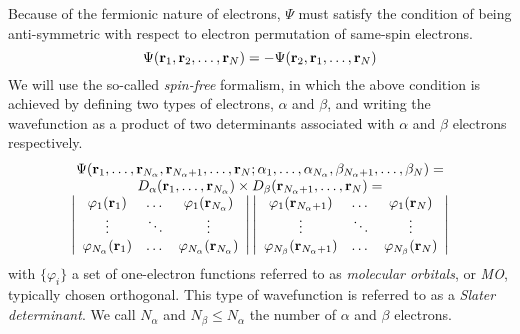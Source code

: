 \documentclass[./thesis.tex]{subfiles}
\begin{document}
Because of the fermionic nature of electrons, $\Psi$ must satisfy the condition of being anti-symmetric with respect to electron permutation of same-spin electrons.
\begin{equation}
\Psi({\bf r}_1, {\bf r}_2,\dots,{\bf r}_N) = -\Psi({\bf r}_2, {\bf r}_1,\dots,{\bf r}_N)
\end{equation}
We will use the so-called \emph{spin-free} formalism, in which the above condition is achieved by defining two types of electrons, $\alpha$ and $\beta$, and writing the wavefunction as a product of two determinants associated with $\alpha$ and $\beta$ electrons respectively.
\begin{equation}
\begin{array}{c}
 \Psi({\bf r}_1,\dots,{\bf r}_{{N_\alpha}},{\bf r}_{{N_\alpha}+1},\dots,{\bf r}_N;
      \alpha_1,\dots,\alpha_{{N_\alpha}},\beta_{{N_\alpha}+1},\dots,\beta_N) = \\
D_\alpha({\bf r}_1,\dots,{\bf r}_{{N_\alpha}}) \times D_\beta({\bf r}_{{N_\alpha}+1},\dots,{\bf r}_N) = \\
\left|
 \begin{array}{ccc}
 \varphi_1({\bf r}_1) & \dots & \varphi_1({\bf r}_{{N_\alpha}}) \\
 \vdots               & \ddots &   \vdots             \\
 \varphi_{{N_\alpha}}({\bf r}_1) & \dots & \varphi_{{N_\alpha}}({\bf r}_{{N_\alpha}}) \\
 \end{array}
\right|
\left|
 \begin{array}{ccc}
 \varphi_1({\bf r}_{{N_\alpha}+1}) & \dots & \varphi_1({\bf r}_{N}) \\
 \vdots               & \ddots &   \vdots             \\
 \varphi_{N_\beta}({\bf r}_{{N_\alpha}+1}) & \dots & \varphi_{N_\beta}({\bf r}_{N}) \\
 \end{array}
\right| \\ 
\end{array} \\
\label{eq:slater}
\end{equation}
with $\{ \varphi_i \}$ a set of one-electron functions referred to as \emph{molecular orbitals}, or \emph{MO}, typically chosen orthogonal. This type of wavefunction is referred to as a \emph{Slater determinant}. We call $N_\alpha$ and $N_\beta \leq N_\alpha$ the number of $\alpha$ and $\beta$ electrons.
\end{document}
